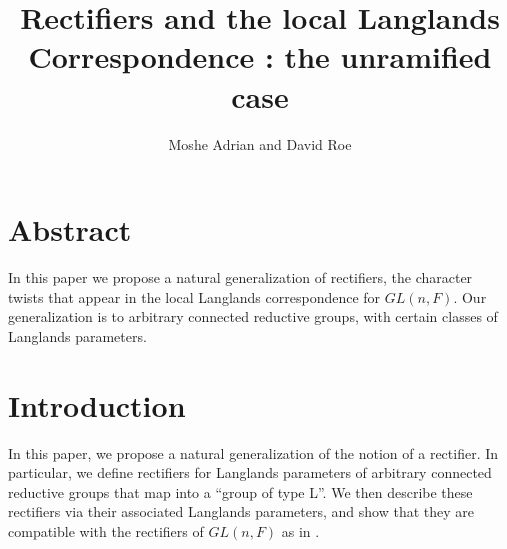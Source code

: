 \documentclass[11pt]{amsart}
\theoremstyle{plain}
\begin{document}
\title{Rectifiers and the local Langlands Correspondence : the unramified case}
\author{Moshe Adrian and David Roe}





\maketitle

\section{Abstract}

In this paper we propose a natural generalization of rectifiers, the character twists that appear in the local Langlands correspondence for $GL(n,F)$.  Our generalization is to arbitrary connected reductive groups, with certain classes of Langlands parameters.

\section{Introduction}
In this paper, we propose a natural generalization of the notion of a rectifier.  In particular, we define rectifiers for Langlands parameters of arbitrary connected reductive groups that map into a ``group of type L''.
We then describe these rectifiers via their associated Langlands parameters, and show that they are compatible with the rectifiers of $GL(n,F)$ as in \cite{bushnellhenniart}.
\end{document}
